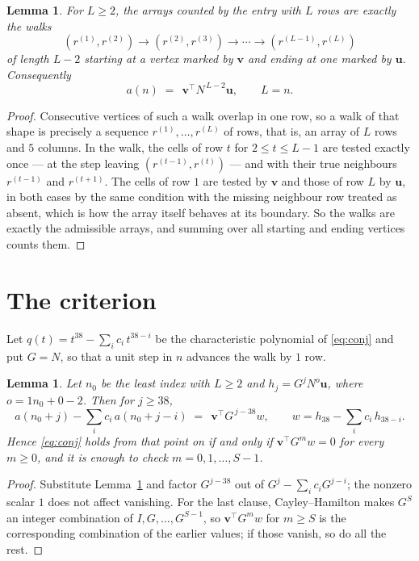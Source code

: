 \documentclass[11pt,a4paper]{article}
\theoremstyle{plain}
\newtheorem{lemma}[theorem]{Lemma}
\theoremstyle{definition}
\begin{document}
\begin{lemma}\label{lem:walk}
For $L\ge2$, the arrays counted by the entry with $L$ rows are exactly the walks
\[
(r^{(1)},r^{(2)})\to(r^{(2)},r^{(3)})\to\cdots\to(r^{(L-1)},r^{(L)})
\]
of length $L-2$ starting at a vertex marked by $\mathbf{v}$ and ending at one marked by
$\mathbf{u}$. Consequently
\[
a(n)\;=\;\,\mathbf{v}^{\!\top}N^{\,L-2}\mathbf{u},\qquad L=n .
\]
\end{lemma}

\begin{proof}
Consecutive vertices of such a walk overlap in one row, so a walk of that shape is
precisely a sequence $r^{(1)},\dots,r^{(L)}$ of rows, that is, an array of $L$ rows
and $5$ columns. In the walk, the cells of row $t$ for $2\le t\le L-1$ are tested
exactly once --- at the step leaving $(r^{(t-1)},r^{(t)})$ --- and with their true
neighbours $r^{(t-1)}$ and $r^{(t+1)}$. The cells of row $1$ are tested by
$\mathbf{v}$ and those of row $L$ by $\mathbf{u}$, in both cases by the same condition
with the missing neighbour row treated as absent, which is how the array itself behaves at
its boundary. So the walks are exactly the admissible arrays, and summing over all starting
and ending vertices counts them.
\end{proof}

\section{The criterion}

Let $q(t)=t^{38}-\sum_i c_i\,t^{38-i}$ be the characteristic polynomial of
\eqref{eq:conj} and put $G=N$, so that a unit step in $n$ advances the walk by
$1$ row.

\begin{lemma}\label{lem:crit}
Let $n_0$ be the least index with $L\ge2$ and $h_j=G^{j}N^{o}\mathbf{u}$, where
$o=1n_0+0-2$. Then for $j\ge38$,
\[
a(n_0+j)-\sum_i c_i\,a(n_0+j-i)\;=\;\,\mathbf{v}^{\!\top}G^{\,j-38}w,
\qquad w=h_{38}-\sum_i c_i\,h_{38-i} .
\]
Hence \eqref{eq:conj} holds from that point on if and only if
$\mathbf{v}^{\!\top}G^{m}w=0$ for every $m\ge0$, and it is enough to check
$m=0,1,\dots,S-1$.
\end{lemma}

\begin{proof}
Substitute Lemma~\ref{lem:walk} and factor $G^{j-38}$ out of
$G^{j}-\sum_ic_iG^{j-i}$; the nonzero scalar $1$ does not affect
vanishing. For the last clause, Cayley--Hamilton makes $G^{S}$ an integer combination of
$I,G,\dots,G^{S-1}$, so $\mathbf{v}^{\!\top}G^{m}w$ for $m\ge S$ is the corresponding
combination of the earlier values; if those vanish, so do all the rest.
\end{proof}
\end{document}
